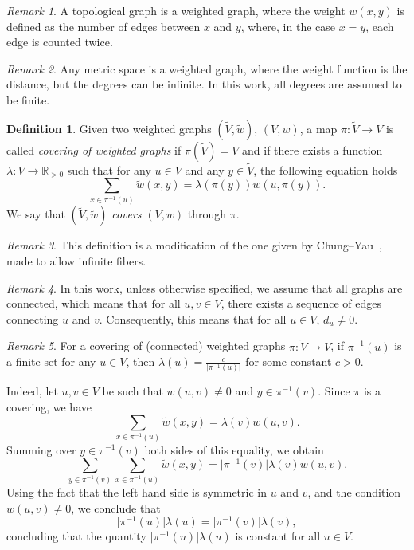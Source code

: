\documentclass[11pt]{amsart}
\newcommand{\R}{\mathbb{R}}
\theoremstyle{definition}
\newtheorem{definition}{Definition}
\theoremstyle{remark}
\newtheorem{remark}{Remark}
\theoremstyle{plain}
\numberwithin{equation}{section}
\numberwithin{lemma}{section}
\numberwithin{definition}{section}
\numberwithin{proposition}{section}
\numberwithin{corollary}{section}
\numberwithin{theorem}{section}
\numberwithin{remark}{section}
\begin{document}
\begin{remark}\label{top_graph}
A topological graph is a weighted graph, where the weight $w(x,y)$ is defined as the number of edges between $x$ and $y$, where, in the case $x=y$, each edge is counted twice. 
\end{remark}

\begin{remark}
 Any metric space is a weighted graph, where the weight function is the distance, but the degrees can be infinite. In this work, all degrees are assumed to be finite.
\end{remark}

\begin{definition}
Given two weighted graphs $(\tilde{V},\tilde{w})$, $(V,w)$, a map $\pi \colon \tilde{V} \to V$ is called \textit{covering of weighted graphs} if $\pi(\tilde{V})=V$ and if there exists a function $\lambda: V \to \R_{>0}$ such that for any $u\in V$ and any $y\in \tilde{V}$, the following equation holds
 \begin{equation}\label{new_def}
\sum_{x\in \pi^{-1}(u)}\tilde{w}(x,y)=\lambda(\pi(y)) w(u,\pi(y)).
\end{equation}
We say that $(\tilde{V},\tilde{w})$ \textit{covers} $(V,w)$ through $\pi$. 
\end{definition} 

\begin{remark}
 This definition is a modification of the one given by Chung--Yau~\cite{MR1667452}, made to allow infinite fibers. 
\end{remark}
 
\begin{remark}
 In this work, unless otherwise specified, we assume that all graphs are connected, which means that for all $u,v\in V$, there exists a sequence of edges connecting $u$ and $v$. Consequently, this means that for all $u\in V$, $d_u\neq0$.
\end{remark}

\begin{remark}\label{new_def_finite_fibers}
For a covering of (connected) weighted graphs $\pi \colon \tilde{V} \to V$, if $\pi^{-1}(u)$ is a finite set for any $u\in V$, then $\lambda(u)=\frac{c}{|\pi^{-1}(u)|}$ for some constant $c>0$.

 Indeed, let $u,v \in V$ be such that $w(u,v)\ne0$ and $y\in\pi^{-1}(v)$. Since $\pi$ is a covering, we have 
 $$
 \sum_{x\in \pi^{-1}(u)}\tilde{w}(x,y)=\lambda(v) w(u,v).
 $$
  Summing over $y\in \pi^{-1}(v)$ both sides of this equality, we obtain
 $$
 \sum_{y\in \pi^{-1}(v)} \sum_{x\in \pi^{-1}(u)}\tilde{w}(x,y) =\vert \pi^{-1}(v)\vert \lambda(v)w(u,v).
 $$
 Using the fact that the left hand side is symmetric in $u$ and $v$, and the condition  $w(u,v)\ne0$, we conclude that 
$$
\vert \pi^{-1}(u)\vert \lambda(u)=\vert \pi^{-1}(v)\vert \lambda(v),
$$
concluding that the quantity $\vert \pi^{-1}(u)\vert \lambda(u)$ is constant for all $u\in V$. 
\end{remark}
\end{document}
